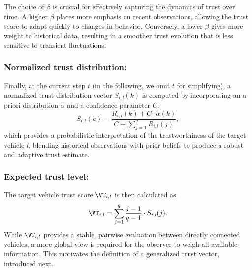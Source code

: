 \begin{remark}
    The choice of $\beta$ is crucial for effectively capturing the dynamics of trust over time. 
    A higher $\beta$ places more emphasis on recent observations, allowing the trust score to adapt quickly to changes in behavior. 
    Conversely, a lower $\beta$ gives more weight to historical data, resulting in a smoother trust evolution that is less sensitive to transient fluctuations.
\end{remark}
\subsubsection{Normalized trust distribution:}
Finally, at the current step $t$ (in the following, we omit $t$ for simplifying), a normalized trust distribution vector $S_{i,l}(k)$ is computed by incorporating an a priori distribution $\alpha$ and a confidence parameter $C$:
\begin{equation}
    S_{i,l}(k) = \dfrac{R_{i,l}(k) + C \cdot \alpha(k)}{C + \sum_{j=1}^{q} R_{i,l}(j)},
\end{equation}
which provides a probabilistic interpretation of the trustworthiness of the target vehicle $l$, blending historical observations with prior beliefs to produce a robust and adaptive trust estimate. 
\subsubsection{Expected trust level:}
The target vehicle trust score $\VT_{i,l}$ is then calculated as:
\begin{equation}
    \VT_{i,l} = \sum_{j=1}^{q} \dfrac{j-1}{q-1} \cdot S_{i,l}(j).
\end{equation}
While $\VT_{i,l}$ provides a stable, pairwise evaluation between directly connected vehicles, a more global view is required for the observer to weigh all available information. This motivates the definition of a generalized trust vector, introduced next.

